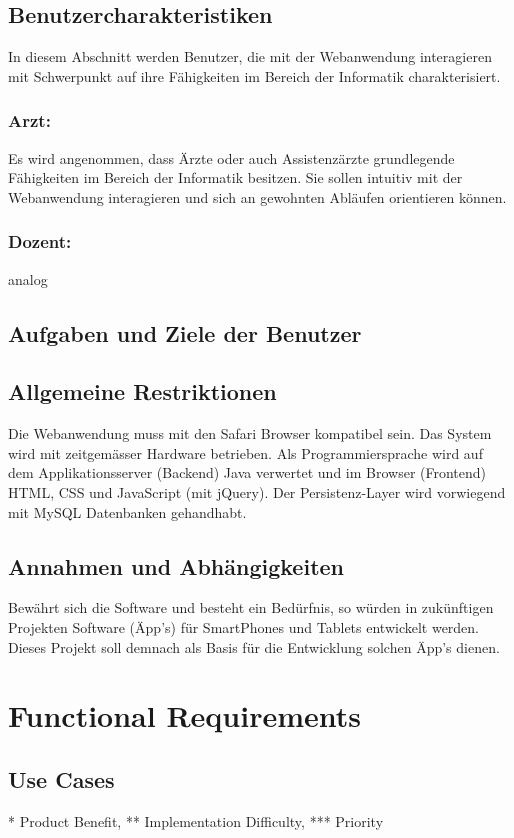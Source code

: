 \subsection{Benutzercharakteristiken}
In diesem Abschnitt werden Benutzer, die mit der Webanwendung interagieren mit Schwerpunkt auf ihre Fähigkeiten im Bereich der Informatik charakterisiert.
	\subsubsection{Arzt:}
Es wird angenommen, dass Ärzte oder auch Assistenzärzte grundlegende Fähigkeiten im Bereich der Informatik besitzen. Sie sollen intuitiv mit der Webanwendung interagieren und sich an gewohnten Abläufen orientieren können.
	\subsubsection{Dozent:}
analog

\subsection{Aufgaben und Ziele der Benutzer}

\subsection{Allgemeine Restriktionen}
Die Webanwendung muss mit den Safari Browser kompatibel sein.
Das System wird mit zeitgemässer Hardware betrieben.
Als Programmiersprache wird auf dem Applikationsserver (Backend) Java verwertet und im Browser (Frontend) HTML, CSS und JavaScript (mit jQuery). Der Persistenz-Layer wird vorwiegend mit MySQL Datenbanken gehandhabt.

\subsection{Annahmen und Abhängigkeiten}
Bewährt sich die Software und besteht ein Bedürfnis, so würden in zukünftigen Projekten Software (Äpp's) für SmartPhones und Tablets entwickelt werden. Dieses Projekt soll demnach als Basis für die Entwicklung solchen Äpp's dienen.

	\section{Functional Requirements}

\subsection{Use Cases}
* Product Benefit, ** Implementation Difficulty, *** Priority

